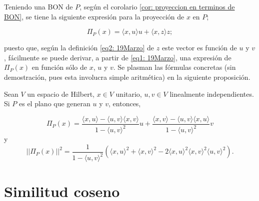 Teniendo una BON de $P$, según el 
corolario 
\ref{cor: proyeccion en terminos de BON}, se tiene la siguiente
expresión para la proyección de $x$ en $P$;

\begin{equation}
\label{eq1: 19Marzo}
\Pi_{P}(x)= \langle x, u \rangle u + \langle x, z \rangle z;
\end{equation}

\noindent
puesto que, según la definición \eqref{eq2: 19Marzo} de 
$z$ este vector es función de $u$ y $v$, fácilmente se
puede derivar, a partir de \eqref{eq1: 19Marzo},
una expresión de $\Pi_{P}(x)$ en función sólo
de $x$, $u$ y $v$. Se plasman las fórmulas 
concretas (sin demostración, pues esta involucra
simple aritmética) en la siguiente proposición.

	\begin{prop}
	\label{prop: formulas 20Marzo}
	Sean $V$ un espacio de Hilbert, $x \in V$ unitario,
	$u,v \in V$ linealmente independientes. Si $P$ es el plano
	que generan $u$ y $v$, entonces,

		\begin{equation}
		\label{eq3: 19Marzo}
		\Pi_{P}(x)= \frac{\langle x, u \rangle -\langle u, v \rangle \langle x, v \rangle }{1-\langle u, v \rangle^{2}} u + \frac{\langle x, v \rangle -\langle u, v \rangle \langle x, u \rangle }{1-\langle u, v \rangle^{2}} v
		\end{equation}
	y 
		\begin{equation}
		\label{eq3: 19Marzo}
		  || \Pi_{P}(x) ||^{2}=
		  \frac{1}{1- \langle u, v \rangle^{2}} \left(  
	       \langle x, u \rangle^{2} +  \langle x, v \rangle^{2}	
	       -2  \langle x, u \rangle^{2} \langle x, v \rangle^{2} \langle u, v \rangle^{2}	  
		  \right).
		\end{equation}
 
	\end{prop}



\section{Similitud coseno}
\label{cosine similarity}

